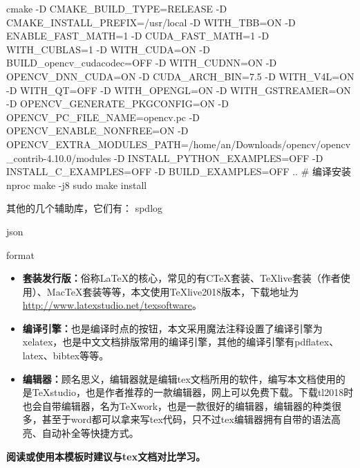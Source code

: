 \begin{itemize}
\begin{listing}
 cmake -D CMAKE_BUILD_TYPE=RELEASE -D CMAKE_INSTALL_PREFIX=/usr/local -D WITH_TBB=ON -D ENABLE_FAST_MATH=1 -D CUDA_FAST_MATH=1 -D WITH_CUBLAS=1 -D WITH_CUDA=ON -D BUILD_opencv_cudacodec=OFF -D WITH_CUDNN=ON -D OPENCV_DNN_CUDA=ON -D CUDA_ARCH_BIN=7.5 
 -D WITH_V4L=ON -D WITH_QT=OFF -D WITH_OPENGL=ON -D WITH_GSTREAMER=ON -D OPENCV_GENERATE_PKGCONFIG=ON -D OPENCV_PC_FILE_NAME=opencv.pc -D OPENCV_ENABLE_NONFREE=ON -D OPENCV_EXTRA_MODULES_PATH=/home/an/Downloads/opencv/opencv_contrib-4.10.0/modules -D INSTALL_PYTHON_EXAMPLES=OFF -D INSTALL_C_EXAMPLES=OFF -D BUILD_EXAMPLES=OFF  ..
 # 编译安装
 nproc
  make -j8
  sudo make install

\end{listing}

其他的几个辅助库，它们有：
spdlog

json

format








\end{itemize}
\begin{itemize}
\item \textbf{套装发行版：}俗称\LaTeX 的核心，常见的有CTeX套装、TeXlive套装（作者使用）、MacTeX套装等等，本文使用TeXlive2018版本，下载地址为\url{http://www.latexstudio.net/texsoftware}。

\item \textbf{编译引擎：}也是编译时点的按钮，本文采用魔法注释设置了编译引擎为xelatex，也是中文文档排版常用的编译引擎，其他的编译引擎有pdflatex、latex、bibtex等等。
 
\item \textbf{编辑器：}顾名思义，编辑器就是编辑tex文档所用的软件，编写本文档使用的是TeXstudio，也是作者推荐的一款编辑器，网上可以免费下载。下载tl2018时也会自带编辑器，名为TeXwork，也是一款很好的编辑器，编辑器的种类很多，甚至于word都可以拿来写tex代码，只不过tex编辑器拥有自带的语法高亮、自动补全等快捷方式。
\end{itemize}

\textbf{阅读或使用本模板时建议与tex文档对比学习。}

